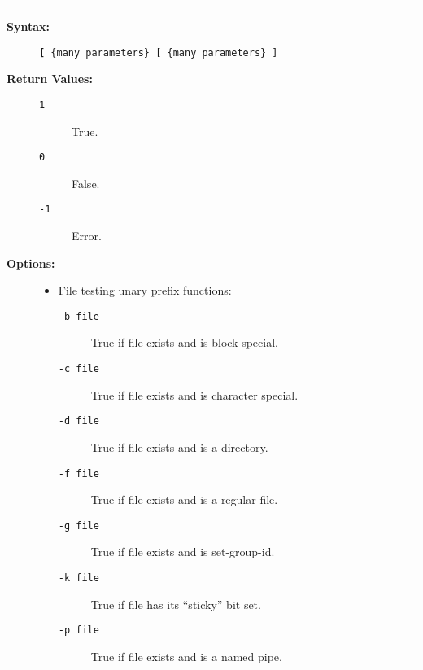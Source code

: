 \hrule
\begin{description}
\item[{\bf Syntax:}] \mbox{}

{\tt {\bf [} \{many parameters\} [ \{many parameters\} ]}

\item[{\bf Return Values:}] \mbox{}

\begin{description}
\item[{\tt 1}] \mbox{}

True.

\item[{\tt 0}] \mbox{}

False.

\item[{\tt -1}] \mbox{}

Error.

\end{description}


\item[{\bf Options:}] \mbox{}

\begin{itemize}
\item File testing unary prefix functions:
\begin{description}
\item[{\tt -b file}] \mbox{}

True if file exists and is block special.

\item[{\tt -c file}] \mbox{}

True if file exists and is character special.

\item[{\tt -d file}] \mbox{}

True if file exists and is a directory.

\item[{\tt -f file}] \mbox{}

True if file exists and is a regular file.

\item[{\tt -g file}] \mbox{}

True if file exists and is set-group-id.

\item[{\tt -k file}] \mbox{}

True if file has its ``sticky'' bit set.

\item[{\tt -p file}] \mbox{}

True if file exists and is a named pipe.


\end{description}
\end{itemize}
\end{description}
